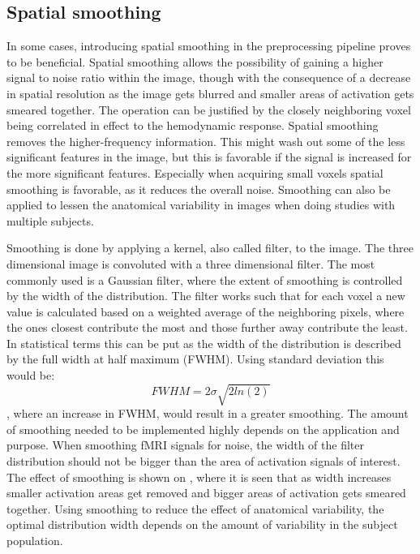 \subsection{Spatial smoothing}

In some cases, introducing spatial smoothing in the preprocessing pipeline proves to be beneficial. Spatial smoothing allows the possibility of gaining a higher signal to noise ratio within the image, though with the consequence of a decrease in spatial resolution as the image gets blurred and smaller areas of activation gets smeared together. The operation can be justified by the closely neighboring voxel being correlated in effect to the hemodynamic response. Spatial smoothing removes the higher-frequency information. This might wash out some of the less significant features in the image, but this is favorable if the signal is increased for the more significant features. Especially when acquiring small voxels spatial smoothing is favorable, as it reduces the overall noise. Smoothing can also be applied to lessen the anatomical variability in images when doing studies with multiple subjects. \cite{Poldrack2011}

Smoothing is done by applying a kernel, also called filter, to the image. The three dimensional image is convoluted with a three dimensional filter. The most commonly used is a Gaussian filter, where the extent of smoothing is controlled by the width of the distribution. The filter works such that for each voxel a new value is calculated based on a weighted average of the neighboring pixels, where the ones closest contribute the most and those further away contribute the least. In statistical terms this can be put as the width of the distribution is described by the full width at half maximum (FWHM). Using standard deviation this would be:
\begin{equation}
FWHM = 2\sigma\sqrt{2ln(2)}
\end{equation} 
, where an increase in FWHM, would result in a greater smoothing. The amount of smoothing needed to be implemented highly depends on the application and purpose. When smoothing fMRI signals for noise, the width of the filter distribution should not be bigger than the area of activation signals of interest. The effect of smoothing is shown on , where it is seen that as width increases smaller activation areas get removed and bigger areas of activation gets smeared together. 
Using smoothing to reduce the effect of anatomical variability, the optimal distribution width depends on the amount of variability in the subject population. \cite{Poldrack2011}
  

